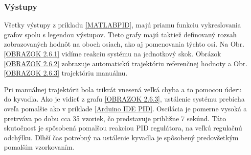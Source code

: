 \subsubsection{Výstupy}

Všetky výstupy z príkladu \ref{MATLABPID}, majú priamu funkciu vykresľovania grafov spolu s legendou výstupov. Tieto grafy majú taktiež definovaný rozsah zobrazovaných hodnôt na oboch osiach, ako aj pomenovania týchto osí. Na Obr. \ref{OBRAZOK 2.6.1} vidíme reakciu systému na jednotkový skok. Obrázok \ref{OBRAZOK 2.6.2} zobrazuje automatickú trajektóriu referenčnej hodnoty a Obr. \ref{OBRAZOK 2.6.3} trajektóriu manuálnu. 

Pri manuálnej trajektórii bola trikrát vnesená veľká chyba a to pomocou úderu do kyvadla. Ako je vidieť z grafu \ref{OBRAZOK 2.6.3}, ustálenie systému prebieha oveľa pomalšie ako v príklade \ref{Arduino IDE PID}. Oscilácia je pomerne vysoká a pretrváva po dobu cca 35 vzoriek, čo predstavuje približne 7 sekúnd. Táto skutočnosť je spôsobená pomalšou reakciou PID regulátora, na veľkú regulačnú odchýlku. Dlhší čas potrebný na ustálenie kyvadla je spôsobený predovšetkým pomalším vzorkovaním. 

